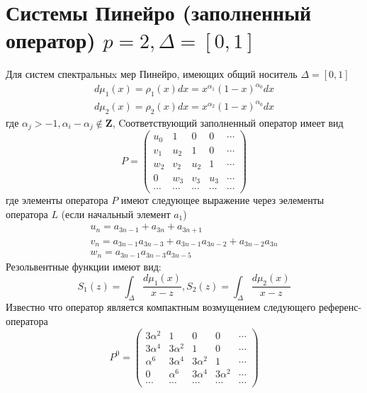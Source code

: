 \documentclass{report}
\begin{document}
\section{Системы Пинейро (заполненный оператор) $p=2, \Delta=[0,1]$}
Для систем спектральныx мер Пинейро, имеющих общий носитель $\Delta=[0,1]$
$$
\begin{array}{llll}
d\mu_1(x)=\rho_1(x) dx = x^{\alpha_1}(1-x)^{\alpha_0} dx \\
d\mu_2(x)=\rho_2(x) dx = x^{\alpha_2}(1-x)^{\alpha_0} dx
\end{array}
$$
где $\alpha_j>-1, \alpha_i-\alpha_j \not \in \textbf {Z}$, 
Cоответствующий заполненный оператор имеет вид
\begin{equation}
P = \left(\begin{array}{ccccccc}
u_0 & 1 & 0 & 0 & \cdots \\
v_1 & u_2 & 1 & 0 & \cdots \\
w_2 & v_2 & u_2 & 1 & \cdots \\
0 & w_3 & v_3 & u_3 & \cdots \\
\cdots & \cdots & \cdots & \cdots & \cdots 
\end{array}\right)
\end{equation}
где элементы оператора $P$ имеют следующее выражение через эелементы оператора $L$ (если начальный элемент $a_1$)
$$
\begin{array}{lllllllllllllll}
u_n = a_{3n-1}+a_{3n}+a_{3n+1} \\
v_n = a_{3n-1} a_{3n-3} + a_{3n-1}a_{3n-2} + a_{3n-2}a_{3n} \\
w_n = a_{3n-1} a_{3n-3} a_{3n-5}
\end{array}
$$
Резольвентные функции имеют вид:
$$
S_1(z)=\int_{\Delta} {\displaystyle \frac{d\mu_1(x)}{x-z}}, S_2(z)=\int_{\Delta} {\displaystyle \frac{d\mu_2(x)}{x-z}}
$$
Известно что оператор является компактным возмущением следующего референс-оператора
\begin{equation}
P^{0} = \left(\begin{array}{ccccccc}
3\alpha^2 & 1 & 0 & 0 & \cdots \\
3\alpha^4 & 3\alpha^2 & 1 & 0 & \cdots \\
\alpha^6 & 3\alpha^4 & 3\alpha^2 & 1 & \cdots \\
0 & \alpha^6 & 3\alpha^4 & 3\alpha^2 & \cdots \\
\cdots & \cdots & \cdots & \cdots & \cdots 
\end{array}\right)
\end{equation}
\end{document}

